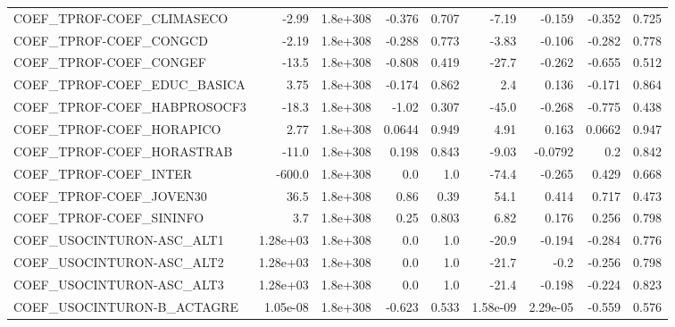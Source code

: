 \begin{tabular}{lrrrrrrrr}
COEF\_TPROF-COEF\_CLIMASECO         &       -2.99 &     1.8e+308 &  -0.376 &    0.707 &      -7.19 &      -0.159 &       -0.352 &         0.725 \\
COEF\_TPROF-COEF\_CONGCD            &       -2.19 &     1.8e+308 &  -0.288 &    0.773 &      -3.83 &      -0.106 &       -0.282 &         0.778 \\
COEF\_TPROF-COEF\_CONGEF            &       -13.5 &     1.8e+308 &  -0.808 &    0.419 &      -27.7 &      -0.262 &       -0.655 &         0.512 \\
COEF\_TPROF-COEF\_EDUC\_BASICA       &        3.75 &     1.8e+308 &  -0.174 &    0.862 &        2.4 &       0.136 &       -0.171 &         0.864 \\
COEF\_TPROF-COEF\_HABPROSOCF3       &       -18.3 &     1.8e+308 &   -1.02 &    0.307 &      -45.0 &      -0.268 &       -0.775 &         0.438 \\
COEF\_TPROF-COEF\_HORAPICO          &        2.77 &     1.8e+308 &  0.0644 &    0.949 &       4.91 &       0.163 &       0.0662 &         0.947 \\
COEF\_TPROF-COEF\_HORASTRAB         &       -11.0 &     1.8e+308 &   0.198 &    0.843 &      -9.03 &     -0.0792 &          0.2 &         0.842 \\
COEF\_TPROF-COEF\_INTER             &      -600.0 &     1.8e+308 &     0.0 &      1.0 &      -74.4 &      -0.265 &        0.429 &         0.668 \\
COEF\_TPROF-COEF\_JOVEN30           &        36.5 &     1.8e+308 &    0.86 &     0.39 &       54.1 &       0.414 &        0.717 &         0.473 \\
COEF\_TPROF-COEF\_SININFO           &         3.7 &     1.8e+308 &    0.25 &    0.803 &       6.82 &       0.176 &        0.256 &         0.798 \\
COEF\_USOCINTURON-ASC\_ALT1         &    1.28e+03 &     1.8e+308 &     0.0 &      1.0 &      -20.9 &      -0.194 &       -0.284 &         0.776 \\
COEF\_USOCINTURON-ASC\_ALT2         &    1.28e+03 &     1.8e+308 &     0.0 &      1.0 &      -21.7 &        -0.2 &       -0.256 &         0.798 \\
COEF\_USOCINTURON-ASC\_ALT3         &    1.28e+03 &     1.8e+308 &     0.0 &      1.0 &      -21.4 &      -0.198 &       -0.224 &         0.823 \\
COEF\_USOCINTURON-B\_ACTAGRE        &    1.05e-08 &     1.8e+308 &  -0.623 &    0.533 &   1.58e-09 &    2.29e-05 &       -0.559 &         0.576 \\

\end{tabular}
